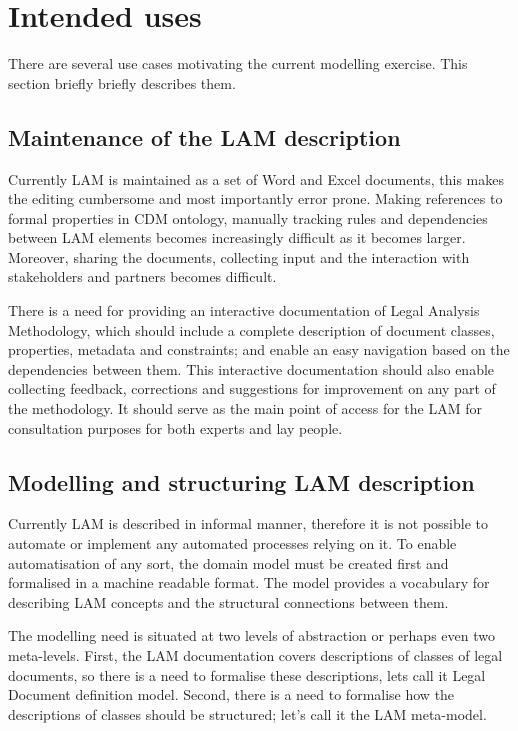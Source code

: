 \hypertarget{ariaid-title1}{%
\section{Intended uses}\label{ariaid-title1}}

There are several use cases motivating the current modelling exercise.
This section briefly briefly describes them.

\hypertarget{maintenance-of-the-lam-description}{%
\subsection{Maintenance of the LAM
description}\label{maintenance-of-the-lam-description}}

Currently LAM is maintained as a set of Word and Excel documents, this
makes the editing cumbersome and most importantly error prone. Making
references to formal properties in CDM ontology, manually tracking rules
and dependencies between LAM elements becomes increasingly difficult as
it becomes larger. Moreover, sharing the documents, collecting input and
the interaction with stakeholders and partners becomes difficult.

There is a need for providing an interactive documentation of Legal
Analysis Methodology, which should include a complete description of
document classes, properties, metadata and constraints; and enable an
easy navigation based on the dependencies between them. This interactive
documentation should also enable collecting feedback, corrections and
suggestions for improvement on any part of the methodology. It should
serve as the main point of access for the LAM for consultation purposes
for both experts and lay people.

\hypertarget{modelling-and-structuring-lam-description}{%
\subsection{Modelling and structuring LAM
description}\label{modelling-and-structuring-lam-description}}

Currently LAM is described in informal manner, therefore it is not
possible to automate or implement any automated processes relying on it.
To enable automatisation of any sort, the domain model must be created
first and formalised in a machine readable format. The model provides a
vocabulary for describing LAM concepts and the structural connections
between them.

The modelling need is situated at two levels of abstraction or perhaps
even two meta-levels. First, the LAM documentation covers descriptions
of classes of legal documents, so there is a need to formalise these
descriptions, lets call it Legal Document definition model. Second,
there is a need to formalise how the descriptions of classes should be
structured; let's call it the LAM meta-model.

